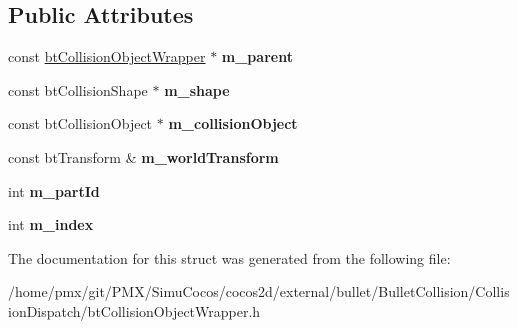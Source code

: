 \subsection*{Public Attributes}
\begin{DoxyCompactItemize}
\item 
\mbox{\label{structbtCollisionObjectWrapper_a9483ed47330698ea8d332b5eaa04fc9a}} 
const \hyperlink{structbtCollisionObjectWrapper}{bt\+Collision\+Object\+Wrapper} $\ast$ {\bfseries m\+\_\+parent}
\item 
\mbox{\label{structbtCollisionObjectWrapper_aa995067a199cf1ed3add62a097a09a13}} 
const bt\+Collision\+Shape $\ast$ {\bfseries m\+\_\+shape}
\item 
\mbox{\label{structbtCollisionObjectWrapper_a3d9c27cf1785e2d2b8ab445ef1794569}} 
const bt\+Collision\+Object $\ast$ {\bfseries m\+\_\+collision\+Object}
\item 
\mbox{\label{structbtCollisionObjectWrapper_a78e9811fdd549f94fd2929cbb623e6e0}} 
const bt\+Transform \& {\bfseries m\+\_\+world\+Transform}
\item 
\mbox{\label{structbtCollisionObjectWrapper_a0908062491f661f426b32dce15cfa812}} 
int {\bfseries m\+\_\+part\+Id}
\item 
\mbox{\label{structbtCollisionObjectWrapper_afc165400299906e5880907d422f7402d}} 
int {\bfseries m\+\_\+index}
\end{DoxyCompactItemize}


The documentation for this struct was generated from the following file\+:\begin{DoxyCompactItemize}
\item 
/home/pmx/git/\+P\+M\+X/\+Simu\+Cocos/cocos2d/external/bullet/\+Bullet\+Collision/\+Collision\+Dispatch/bt\+Collision\+Object\+Wrapper.\+h\end{DoxyCompactItemize}
